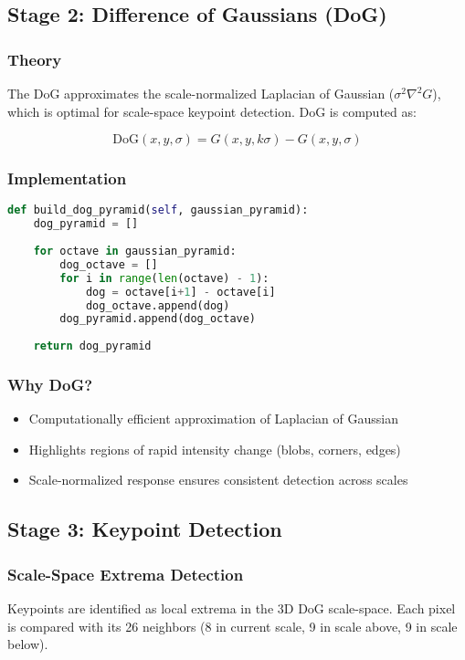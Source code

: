 \documentclass[12pt,a4paper]{article}
\begin{document}
\subsection{Stage 2: Difference of Gaussians (DoG)}

\subsubsection{Theory}
The DoG approximates the scale-normalized Laplacian of Gaussian ($\sigma^2\nabla^2G$), which is optimal for scale-space keypoint detection. DoG is computed as:

\begin{equation}
\text{DoG}(x, y, \sigma) = G(x, y, k\sigma) - G(x, y, \sigma)
\end{equation}

\subsubsection{Implementation}
\begin{lstlisting}[language=Python]
def build_dog_pyramid(self, gaussian_pyramid):
    dog_pyramid = []
    
    for octave in gaussian_pyramid:
        dog_octave = []
        for i in range(len(octave) - 1):
            dog = octave[i+1] - octave[i]
            dog_octave.append(dog)
        dog_pyramid.append(dog_octave)
    
    return dog_pyramid
\end{lstlisting}

\subsubsection{Why DoG?}
\begin{itemize}
    \item Computationally efficient approximation of Laplacian of Gaussian
    \item Highlights regions of rapid intensity change (blobs, corners, edges)
    \item Scale-normalized response ensures consistent detection across scales
\end{itemize}

\subsection{Stage 3: Keypoint Detection}

\subsubsection{Scale-Space Extrema Detection}
Keypoints are identified as local extrema in the 3D DoG scale-space. Each pixel is compared with its 26 neighbors (8 in current scale, 9 in scale above, 9 in scale below).
\end{document}
